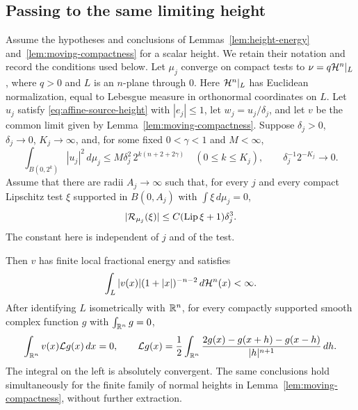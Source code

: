 \subsection{Passing to the same limiting height}

\begin{proposition}\label{prop:height-equation}
Assume the hypotheses and conclusions of
Lemmas~\ref{lem:height-energy} and~\ref{lem:moving-compactness} for a scalar
height. We retain their notation and record the conditions used below.
Let $\mu_j$ converge on compact tests to
$\nu=q\mathcal H^n|_L$, where $q>0$ and $L$ is an $n$-plane through $0$.
Here $\mathcal H^n|_L$ has Euclidean normalization, equal to Lebesgue measure
in orthonormal coordinates on $L$.
Let $u_j$ satisfy \eqref{eq:affine-source-height} with $|e_j|\le1$, let
$w_j=u_j/\delta_j$, and let $v$ be the common limit given by
Lemma~\ref{lem:moving-compactness}.  Suppose $\delta_j>0$, $\delta_j\to0$,
$K_j\to\infty$,
and, for some fixed $0<\gamma<1$ and $M<\infty$,
\begin{equation}\label{eq:height-source-moment}
 \int_{B(0,2^k)}|u_j|^2\,d\mu_j
       \le M\delta_j^2\,2^{k(n+2+2\gamma)}
       \quad(0\le k\le K_j),\qquad
 \delta_j^{-1}2^{-K_j}\longrightarrow0.
\end{equation}
Assume that there are radii $A_j\to\infty$ such that, for every $j$ and
every compact Lipschitz test $\xi$ supported in $B(0,A_j)$ with
$\int\xi\,d\mu_j=0$,
\begin{equation}\label{eq:height-source-oscillation}
 |\mathcal R_{\mu_j}(\xi)|
      \le C(\operatorname{Lip}\xi+1)\delta_j^3.
\end{equation}
The constant here is independent of $j$ and of the test.

Then $v$ has finite local fractional energy and satisfies
\begin{equation}\label{eq:limit-height-weight}
 \int_L |v(x)|(1+|x|)^{-n-2}\,d\mathcal H^n(x)<\infty.
\end{equation}
After identifying $L$ isometrically with $\mathbb R^n$, for every compactly
supported smooth complex function $g$ with $\int_{\mathbb R^n}g=0$,
\begin{equation}\label{eq:limit-fractional-equation}
 \int_{\mathbb R^n}v(x)\mathcal Lg(x)\,dx=0,
 \qquad
 \mathcal Lg(x)=\frac12\int_{\mathbb R^n}
       \frac{2g(x)-g(x+h)-g(x-h)}{|h|^{n+1}}\,dh.
\end{equation}
The integral on the left is absolutely convergent.  The same conclusions
hold simultaneously for the finite family of normal heights in
Lemma~\ref{lem:moving-compactness}, without further extraction.
\end{proposition}


